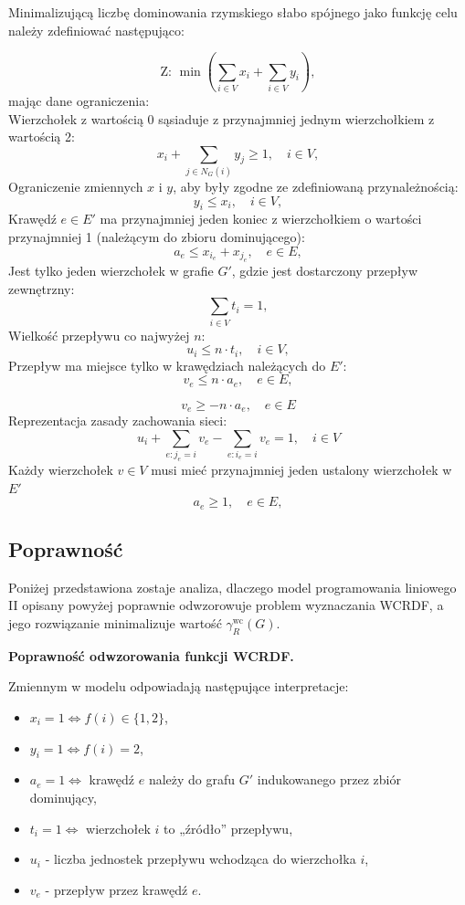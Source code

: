 Minimalizującą liczbę dominowania rzymskiego słabo spójnego jako funkcję celu należy zdefiniować następująco:

\[
\text{Z: } \min \left( \sum_{i \in V} x_i + \sum_{i \in V} y_i \right),
\]
mając dane ograniczenia:\\
Wierzchołek z wartością 0 sąsiaduje z przynajmniej jednym wierzchołkiem z wartością 2:
\[
x_i + \sum_{j \in N_G(i)} y_j \geq 1, \quad i \in V, \tag{1}
\]
Ograniczenie zmiennych $x$ i $y$, aby były zgodne ze zdefiniowaną przynależnością:
\[
y_i \leq x_i, \quad i \in V, \tag{2}
\]
Krawędź $e \in E'$ ma przynajmniej jeden koniec z wierzchołkiem o wartości przynajmniej 1 (należącym do zbioru dominującego):
\[
a_e \leq x_{i_e} + x_{j_e}, \quad e \in E, \tag{3}
\]
Jest tylko jeden wierzchołek w grafie $G'$, gdzie jest dostarczony przepływ zewnętrzny:
\[
\sum_{i \in V} t_i = 1, \tag{4}
\]
Wielkość przepływu co najwyżej $n$:
\[
u_i \leq n \cdot t_i, \quad i \in V, \tag{5}
\]
Przepływ ma miejsce tylko w krawędziach należących do $E'$:
\[
v_e \leq n \cdot a_e, \quad e \in E, \tag{6}
\]

\[
v_e \geq -n \cdot a_e, \quad e \in E \tag{7}
\]
Reprezentacja zasady zachowania sieci:
\[
u_i + \sum_{e: j_e = i} v_e - \sum_{e: i_e = i} v_e = 1, \quad i \in V \tag{8}
\]
Każdy wierzchołek $v \in V$ musi mieć przynajmniej jeden ustalony wierzchołek w $E'$
\[
a_e \geq 1, \quad e \in E, \tag{9}
\]

\subsection{Poprawność}

Poniżej przedstawiona zostaje analiza, dlaczego model programowania liniowego II opisany
powyżej poprawnie odwzorowuje problem wyznaczania WCRDF, a jego rozwiązanie minimalizuje
wartość $\gamma_R^{\text{wc}}(G)$.

\textbf{Poprawność odwzorowania funkcji WCRDF.}

Zmiennym w modelu odpowiadają następujące interpretacje:
\begin{itemize}
    \item $x_i = 1 \iff f(i) \in \{1,2\}$,
    \item $y_i = 1 \iff f(i) = 2$,
    \item $a_e = 1 \iff$ krawędź $e$ należy do grafu $G'$ indukowanego przez zbiór dominujący,
    \item $t_i = 1 \iff$ wierzchołek $i$ to „źródło” przepływu,
    \item $u_i$ - liczba jednostek przepływu wchodząca do wierzchołka $i$,
    \item $v_e$ - przepływ przez krawędź $e$.
\end{itemize}

